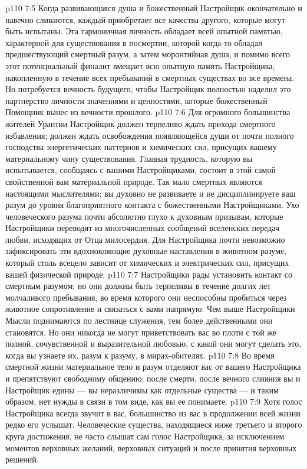 \vs p110 7:5 Когда развивающаяся душа и божественный Настройщик окончательно и навечно сливаются, каждый приобретает все качества другого, которые могут быть испытаны. Эта гармоничная личность обладает всей опытной памятью, характерной для существования в посмертии, которой когда\hyp{}то обладал предшествующий смертный разум, а затем моронтийная душа, и помимо всего этот потенциальный финалит вмещает всю опытную память Настройщика, накопленную в течение всех пребываний в смертных существах во все времена. Но потребуется вечность будущего, чтобы Настройщик полностью наделил это партнерство личности значениями и ценностями, которые божественный Помощник вынес из вечности прошлого.
\vs p110 7:6 \pc Для огромного большинства жителей Урантии Настройщик должен терпеливо ждать прихода смертного избавления; должен ждать освобождения появляющейся души от почти полного господства энергетических паттернов и химических сил, присущих вашему материальному чину существования. Главная трудность, которую вы испытывается, сообщаясь с вашими Настройщиками, состоит в этой самой свойственной вам материальной природе. Так мало смертных являются настоящими мыслителями; вы духовно не развиваете и не дисциплинируете ваш разум до уровня благоприятного контакта с божественными Настройщиками. Ухо человеческого разума почти абсолютно глухо к духовным призывам, которые Настройщики переводят из многочисленных сообщений вселенских передач любви, исходящих от Отца милосердия. Для Настройщика почти невозможно зафиксировать эти вдохновляющие духовные наставления в животном разуме, который столь всецело зависит от химических и электрических сил, присущих вашей физической природе.
\vs p110 7:7 Настройщики рады установить контакт со смертным разумом; но они должны быть терпеливы в течение долгих лет молчаливого пребывания, во время которого они неспособны пробиться через животное сопротивление и связаться с вами напрямую. Чем выше Настройщики Мысли поднимаются по лестнице служения, тем более действенными они становятся. Но они никогда не могут приветствовать вас во плоти с той же полной, сочувственной и выразительной любовью, с какой они могут сделать это, когда вы узнаете их, разум к разуму, в мирах\hyp{}обителях.
\vs p110 7:8 Во время смертной жизни материальное тело и разум отделяют вас от вашего Настройщика и препятствуют свободному общению; после смерти, после вечного слияния вы и Настройщик едины --- вы неразличимы как отдельные существа --- и таким образом, нет нужды в связи в том виде, как вы ее понимаете.
\vs p110 7:9 Хотя голос Настройщика всегда звучит в вас, большинство из вас в продолжении всей жизни редко его услышат. Человеческие существа, находящиеся ниже третьего и второго круга достижения, не часто слышат сам голос Настройщика, за исключением моментов верховных желаний, верховных ситуаций и после принятия верховных решений.
